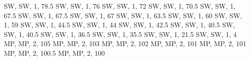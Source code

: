 \documentclass[
]{book}
\newenvironment{Shaded}{\begin{snugshade}}{\end{snugshade}}
\newcommand{\StringTok}[1]{\textcolor[rgb]{0.31,0.60,0.02}{#1}}
\begin{document}
\begin{Shaded}
\begin{Highlighting}[]
\StringTok{ \textquotesingle{}SW\textquotesingle{}, \textquotesingle{}SW\textquotesingle{}, 1, 78.5}
\StringTok{ \textquotesingle{}SW\textquotesingle{}, \textquotesingle{}SW\textquotesingle{}, 1, 76}
\StringTok{ \textquotesingle{}SW\textquotesingle{}, \textquotesingle{}SW\textquotesingle{}, 1, 72}
\StringTok{ \textquotesingle{}SW\textquotesingle{}, \textquotesingle{}SW\textquotesingle{}, 1, 70.5}
\StringTok{ \textquotesingle{}SW\textquotesingle{}, \textquotesingle{}SW\textquotesingle{}, 1, 67.5}
\StringTok{ \textquotesingle{}SW\textquotesingle{}, \textquotesingle{}SW\textquotesingle{}, 1, 67.5}
\StringTok{ \textquotesingle{}SW\textquotesingle{}, \textquotesingle{}SW\textquotesingle{}, 1, 67}
\StringTok{ \textquotesingle{}SW\textquotesingle{}, \textquotesingle{}SW\textquotesingle{}, 1, 63.5}
\StringTok{ \textquotesingle{}SW\textquotesingle{}, \textquotesingle{}SW\textquotesingle{}, 1, 60}
\StringTok{ \textquotesingle{}SW\textquotesingle{}, \textquotesingle{}SW\textquotesingle{}, 1, 59}
\StringTok{ \textquotesingle{}SW\textquotesingle{}, \textquotesingle{}SW\textquotesingle{}, 1, 44.5}
\StringTok{ \textquotesingle{}SW\textquotesingle{}, \textquotesingle{}SW\textquotesingle{}, 1, 44}
\StringTok{ \textquotesingle{}SW\textquotesingle{}, \textquotesingle{}SW\textquotesingle{}, 1, 42.5}
\StringTok{ \textquotesingle{}SW\textquotesingle{}, \textquotesingle{}SW\textquotesingle{}, 1, 40.5}
\StringTok{ \textquotesingle{}SW\textquotesingle{}, \textquotesingle{}SW\textquotesingle{}, 1, 40.5}
\StringTok{ \textquotesingle{}SW\textquotesingle{}, \textquotesingle{}SW\textquotesingle{}, 1, 36.5}
\StringTok{ \textquotesingle{}SW\textquotesingle{}, \textquotesingle{}SW\textquotesingle{}, 1, 35.5}
\StringTok{ \textquotesingle{}SW\textquotesingle{}, \textquotesingle{}SW\textquotesingle{}, 1, 21.5}
\StringTok{ \textquotesingle{}SW\textquotesingle{}, \textquotesingle{}SW\textquotesingle{}, 1, 4}
\StringTok{ \textquotesingle{}MP\textquotesingle{}, \textquotesingle{}MP\textquotesingle{}, 2, 105}
\StringTok{ \textquotesingle{}MP\textquotesingle{}, \textquotesingle{}MP\textquotesingle{}, 2, 103}
\StringTok{ \textquotesingle{}MP\textquotesingle{}, \textquotesingle{}MP\textquotesingle{}, 2, 102}
\StringTok{ \textquotesingle{}MP\textquotesingle{}, \textquotesingle{}MP\textquotesingle{}, 2, 101}
\StringTok{ \textquotesingle{}MP\textquotesingle{}, \textquotesingle{}MP\textquotesingle{}, 2, 101}
\StringTok{ \textquotesingle{}MP\textquotesingle{}, \textquotesingle{}MP\textquotesingle{}, 2, 100.5}
\StringTok{ \textquotesingle{}MP\textquotesingle{}, \textquotesingle{}MP\textquotesingle{}, 2, 100}

\end{Highlighting}
\end{Shaded}
\end{document}
